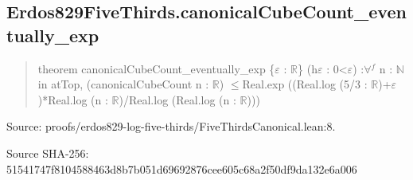 \documentclass[11pt,a4paper]{article}
\begin{document}
\begin{samepage}
\subsection{Erdos829FiveThirds.canonicalCubeCount\_eventually\_exp}
\begin{quote}\small\ttfamily theorem canonicalCubeCount\_eventually\_exp \{\ensuremath{\varepsilon} : \ensuremath{\mathbb{R}}\} (h\ensuremath{\varepsilon} : 0<\ensuremath{\varepsilon}) :\newline     \ensuremath{\forall}\ensuremath{^{f}} n : \ensuremath{\mathbb{N}} in atTop, (canonicalCubeCount n : \ensuremath{\mathbb{R}}) \ensuremath{\leq}\newline       Real.exp ((Real.log (5/3 : \ensuremath{\mathbb{R}})+\ensuremath{\varepsilon})*Real.log (n : \ensuremath{\mathbb{R}})/Real.log (Real.log (n : \ensuremath{\mathbb{R}})))\end{quote}
{\small Source: proofs/erdos829-log-five-thirds/FiveThirdsCanonical.lean:8.\par}

{\small Source SHA-256: 51541747f8104588463d8b7b051d69692876cee605c68a2f50df9da132e6a006\par}

\end{samepage}
\end{document}
